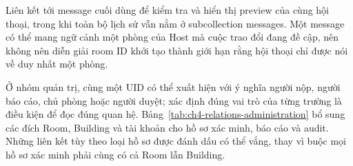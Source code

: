Liên kết tới message cuối dùng để kiểm tra và hiển thị preview của cùng hội thoại, trong khi toàn bộ lịch sử vẫn nằm ở subcollection messages. Một message có thể mang ngữ cảnh một phòng của Host mà cuộc trao đổi đang đề cập, nên không nên diễn giải room ID khởi tạo thành giới hạn rằng hội thoại chỉ được nói về duy nhất một phòng.

Ở nhóm quản trị, cùng một UID có thể xuất hiện với ý nghĩa người nộp, người báo cáo, chủ phòng hoặc người duyệt; xác định đúng vai trò của từng trường là điều kiện để đọc đúng quan hệ. Bảng~\ref{tab:ch4-relations-administration} bổ sung các đích Room, Building và tài khoản cho hồ sơ xác minh, báo cáo và audit. Những liên kết tùy theo loại hồ sơ được đánh dấu có thể vắng, thay vì buộc mọi hồ sơ xác minh phải cùng có cả Room lẫn Building.


